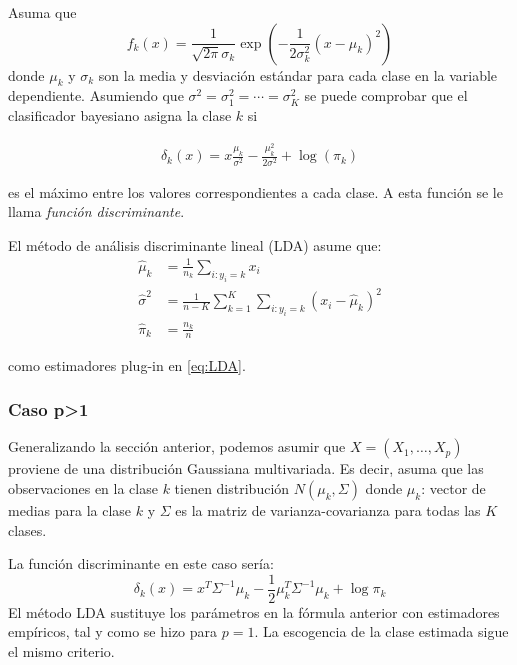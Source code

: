 \documentclass[
  12pt,
]{book}
\theoremstyle{definition}
\theoremstyle{definition}
\theoremstyle{definition}
\theoremstyle{definition}
\theoremstyle{remark}
\begin{document}
Asuma que
\[f_k(x)=\frac{1}{\sqrt{2\pi}\sigma_k}\exp\left(-\frac{1}{2\sigma_k^2}(x-\mu_k)^2\right)\]
donde \(\mu_k\) y \(\sigma_k\) son la media y desviación estándar para cada clase en la variable dependiente. Asumiendo que \(\sigma^2=\sigma_1^2=\cdots=\sigma_K^2\) se puede comprobar que el clasificador bayesiano asigna la clase \(k\) si

\begin{align}
\delta_k(x)=x\frac{\mu_k}{\sigma^2}-\frac{\mu_k^2}{2\sigma^2}+\log(\pi_k)
\label{eq:LDA}
\end{align}

es el máximo entre los valores correspondientes a cada clase. A esta función se le llama \emph{función discriminante}.

El método de análisis discriminante lineal (LDA) asume que:
\begin{align*}
\hat \mu_k&=\frac{1}{n_k}\sum_{i:y_i=k}x_i\\
\hat \sigma^2&=\frac{1}{n-K}\sum_{k=1}^K\sum_{i:y_i=k}(x_i-\hat \mu_k)^2\\
\hat \pi_k &=\frac{n_k}{n}
\end{align*}

como estimadores plug-in en \eqref{eq:LDA}.

\hypertarget{caso-p1-1}{%
\subsubsection{Caso p\textgreater1}\label{caso-p1-1}}

Generalizando la sección anterior, podemos asumir que \(X=(X_1,\ldots,X_p)\) proviene de una distribución Gaussiana multivariada. Es decir, asuma que las observaciones en la clase \(k\) tienen distribución \(N(\mu_k,\Sigma)\) donde \(\mu_k\): vector de medias para la clase \(k\) y \(\Sigma\) es la matriz de varianza-covarianza para todas las \(K\) clases.

La función discriminante en este caso sería:
\[\delta_k(x)=x^T\Sigma^{-1} \mu_k-\frac 1 2\mu_k^T \Sigma^{-1}\mu_k+\log \pi_k\]
El método LDA sustituye los parámetros en la fórmula anterior con estimadores empíricos, tal y como se hizo para \(p=1\). La escogencia de la clase estimada sigue el mismo criterio.
\end{document}
